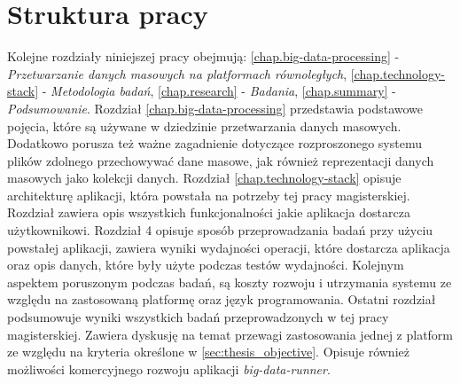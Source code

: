 \section{Struktura pracy}
Kolejne rozdziały niniejszej pracy obejmują: \ref{chap.big-data-processing} - \textit{Przetwarzanie danych masowych na platformach równoległych}, \ref{chap.technology-stack} - \textit{Metodologia badań}, \ref{chap.research} - \textit{Badania}, \ref{chap.summary} - \textit{Podsumowanie}. Rozdział \ref{chap.big-data-processing} przedstawia podstawowe pojęcia, które są używane w dziedzinie przetwarzania danych masowych. Dodatkowo porusza też ważne zagadnienie dotyczące rozproszonego systemu plików zdolnego przechowywać dane masowe, jak również reprezentacji danych masowych jako kolekcji danych. Rozdział \ref{chap.technology-stack} opisuje architekturę aplikacji, która powstała na potrzeby tej pracy magisterskiej. Rozdział zawiera opis wszystkich funkcjonalności jakie aplikacja dostarcza użytkownikowi. Rozdział 4 opisuje sposób przeprowadzania badań przy użyciu powstałej aplikacji, zawiera wyniki wydajności operacji, które dostarcza aplikacja oraz opis danych, które były użyte podczas testów wydajności. Kolejnym aspektem poruszonym podczas badań, są koszty rozwoju i utrzymania systemu ze względu na zastosowaną platformę oraz język programowania. Ostatni rozdział podsumowuje wyniki wszystkich badań przeprowadzonych w tej pracy magisterskiej. Zawiera dyskusję na temat przewagi zastosowania jednej z platform ze względu na kryteria określone w \ref{sec:thesis_objective}. Opisuje również możliwości komercyjnego rozwoju aplikacji \textit{big-data-runner}.

